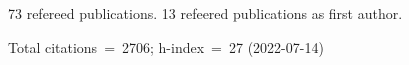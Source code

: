 73 refereed publications. 13 refeered publications as first author.

Total citations~=~2706; h-index~=~27 (2022-07-14)
